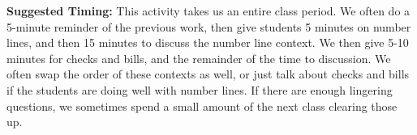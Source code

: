 \documentclass[nooutcomes,noauthor,handout]{ximera}
\begin{document}
\begin{instructorNotes}
{\bf Suggested Timing:} This activity takes us an entire class period.  We often do a 5-minute reminder of the previous work, then give students 5 minutes on number lines, and then 15 minutes to discuss the number line context.  We then give 5-10 minutes for checks and bills, and the remainder of the time to discussion.  We often swap the order of these contexts as well, or just talk about checks and bills if the students are doing well with number lines.  If there are enough lingering questions, we sometimes spend a small amount of the next class clearing those up.
\end{instructorNotes}
\end{document}
